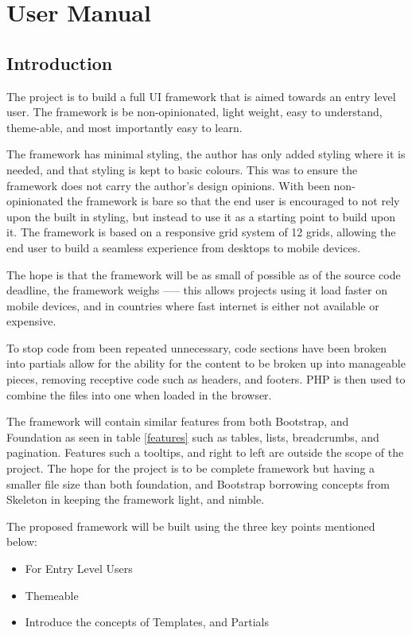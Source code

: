 \newpage
\chapter*{User Manual}
\section*{Introduction}

The project is to build a full UI framework that is aimed towards an entry level user. The framework is be non-opinionated, light weight, easy to understand, theme-able, and most importantly easy to learn.

The framework has minimal styling, the author has only added styling where it is needed, and that styling is kept to basic colours. This was to ensure the framework does not carry the author's design opinions. With been non-opinionated the framework is bare so that the end user is encouraged to not rely upon the built in styling, but instead to use it as a starting point to build upon it. The framework is based on a responsive grid system of 12 grids, allowing the end user to build a seamless experience from desktops to mobile devices.

The hope is that the framework will be as small of possible as of the source code deadline, the framework weighs ----- this allows projects using it load faster on mobile devices, and in countries where fast internet is either not available or expensive. 

To stop code from been repeated unnecessary, code sections have been broken into partials allow for the ability for the content to be broken up into manageable pieces, removing receptive code such as headers, and footers. PHP is then used to combine the files into one when loaded in the browser. 

The framework will contain similar features from both Bootstrap, and Foundation as seen in table \ref{features} such as tables, lists, breadcrumbs, and pagination. Features such a tooltips, and right to left are outside the scope of the project. The hope for the project is to be complete framework but having a smaller file size than both foundation, and Bootstrap borrowing concepts from Skeleton in keeping the framework light, and nimble. 

The proposed framework will be built using the three key points mentioned below: 
\begin{itemize}
	\item For Entry Level Users
	\item Themeable
	\item Introduce the concepts of Templates, and Partials
\end{itemize}
